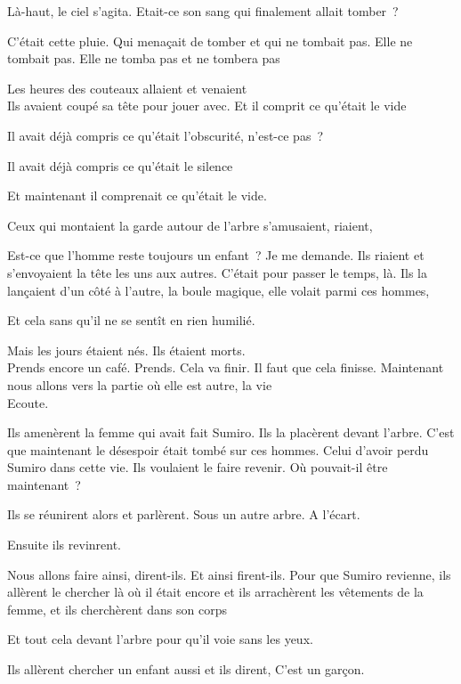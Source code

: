 Là-haut, le ciel s'agita. Etait-ce son sang qui finalement allait
tomber~?

C'était cette pluie. Qui menaçait de tomber et qui ne tombait pas. Elle
ne tombait pas. Elle ne tomba pas et ne tombera pas

Les heures des couteaux allaient et venaient\\

Ils avaient coupé sa tête pour jouer avec. Et il comprit ce qu'était le
vide

Il avait déjà compris ce qu'était l'obscurité, n'est-ce pas~?

Il avait déjà compris ce qu'était le silence

Et maintenant il comprenait ce qu'était le vide.

Ceux qui montaient la garde autour de l'arbre s'amusaient, riaient,

Est-ce que l'homme reste toujours un enfant~? Je me demande. Ils riaient
et s'envoyaient la tête les uns aux autres. C'était pour passer le
temps, là. Ils la lançaient d'un côté à l'autre, la boule magique, elle
volait parmi ces hommes,

Et cela sans qu'il ne se sentît en rien humilié.

Mais les jours étaient nés. Ils étaient morts.\\

Prends encore un café. Prends. Cela va finir. Il faut que cela finisse.
Maintenant nous allons vers la partie où elle est autre, la vie\\

Ecoute.

Ils amenèrent la femme qui avait fait Sumiro. Ils la placèrent devant
l'arbre. C'est que maintenant le désespoir était tombé sur ces hommes.
Celui d'avoir perdu Sumiro dans cette vie. Ils voulaient le faire
revenir. Où pouvait-il être maintenant~?

Ils se réunirent alors et parlèrent. Sous un autre arbre. A l'écart.

Ensuite ils revinrent.

Nous allons faire ainsi, dirent-ils. Et ainsi firent-ils. Pour que
Sumiro revienne, ils allèrent le chercher là où il était encore et ils
arrachèrent les vêtements de la femme, et ils cherchèrent dans son corps

Et tout cela devant l'arbre pour qu'il voie sans les yeux.

Ils allèrent chercher un enfant aussi et ils dirent, C'est un garçon.

